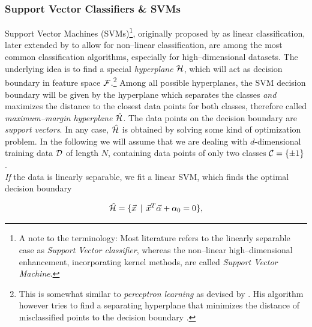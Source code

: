 \subsubsection{Support Vector Classifiers \& SVMs}

Support Vector Machines (SVMs)\footnote{A note to the terminology: Most literature refers to the linearly separable case as \emph{Support Vector classifier}, whereas the non--linear high--dimensional enhancement, incorporating kernel methods, are called \emph{Support Vector Machine}.}, originally proposed by \citet{vapnik1963} as linear classification, later extended by \citet{cortes1995} to allow for non--linear classification, are among the most common classification algorithms, especially for high--dimensional datasets. The underlying idea is to find a special \emph{hyperplane} $\mathcal{H}$, which will act as decision boundary in feature space $\mathcal{F}$.\footnote{This is somewhat similar to \emph{perceptron learning} as devised by \citet{rosenblatt1958}. His algorithm however tries to find a separating hyperplane that minimizes the distance of misclassified points to the decision boundary \citep{hastie2001}.} Among all possible hyperplanes, the SVM decision boundary will be given by the hyperplane which separates the classes \emph{and} maximizes the distance to the closest data points for both classes, therefore called \emph{maximum--margin hyperplane} $\hat {\mathcal{H}}$. The data points on the decision boundary are \emph{support vectors}. In any case, $\hat {\mathcal{H}}$ is obtained by solving some kind of optimization problem. In the following we will assume that we are dealing with $d$-dimensional training data $\mathcal{D}$ of length $N$, containing data points of only two classes $\mathcal{C} = \{ \pm 1 \}$. \\



\emph{If} the data is linearly separable, we fit a linear SVM, which finds the optimal decision boundary

\begin{equation}
\hat {\mathcal{H}} = \{ \vec x \, \mid \, \vec x^T \vec \alpha + \alpha_0 = 0 \},
\end{equation}

